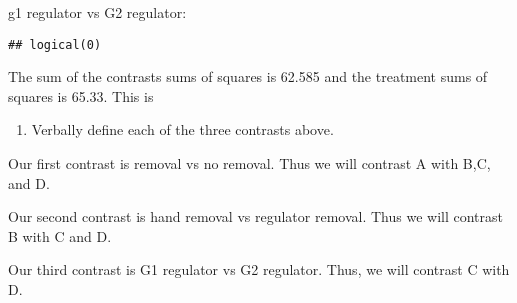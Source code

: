 \documentclass[]{article}
\newenvironment{Shaded}{\begin{snugshade}}{\end{snugshade}}
\newcommand{\KeywordTok}[1]{\textcolor[rgb]{0.13,0.29,0.53}{\textbf{#1}}}
\newcommand{\DecValTok}[1]{\textcolor[rgb]{0.00,0.00,0.81}{#1}}
\newcommand{\StringTok}[1]{\textcolor[rgb]{0.31,0.60,0.02}{#1}}
\newcommand{\OperatorTok}[1]{\textcolor[rgb]{0.81,0.36,0.00}{\textbf{#1}}}
\newcommand{\NormalTok}[1]{#1}
\providecommand{\tightlist}{%
  \setlength{\itemsep}{0pt}\setlength{\parskip}{0pt}}
\begin{document}
g1 regulator vs G2 regulator:

\begin{Shaded}
\end{Shaded}

\begin{verbatim}
## logical(0)
\end{verbatim}

The sum of the contrasts sums of squares is 62.585 and the treatment
sums of squares is 65.33. This is

\begin{enumerate}
\def\labelenumi{\Alph{enumi})}
\setcounter{enumi}{1}
\tightlist
\item
  Verbally define each of the three contrasts above.
\end{enumerate}

Our first contrast is removal vs no removal. Thus we will contrast A
with B,C, and D.

Our second contrast is hand removal vs regulator removal. Thus we will
contrast B with C and D.

Our third contrast is G1 regulator vs G2 regulator. Thus, we will
contrast C with D.
\end{document}
